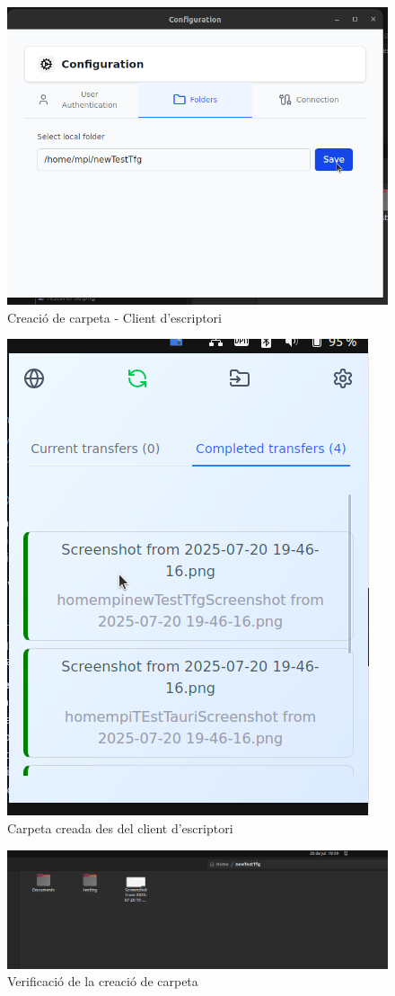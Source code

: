 \begin{figure}[H]
\centering
\includegraphics[width=0.7\linewidth]{Figures/implementacio/desktopNewFolder.png}
\caption{Creació de carpeta - Client d'escriptori}
\label{fig:desktopNewFolder}
\end{figure}

\begin{figure}[H]
\centering
\includegraphics[width=0.7\linewidth]{Figures/implementacio/desktopNewFolderSuccess.png}
\caption{Carpeta creada des del client d'escriptori}
\label{fig:desktopNewFolderSuccess}
\end{figure}

\begin{figure}[H]
\centering
\includegraphics[width=0.7\linewidth]{Figures/implementacio/desktopNewFolderSuccess2.png}
\caption{Verificació de la creació de carpeta}
\label{fig:desktopNewFolderSuccess2}
\end{figure}

